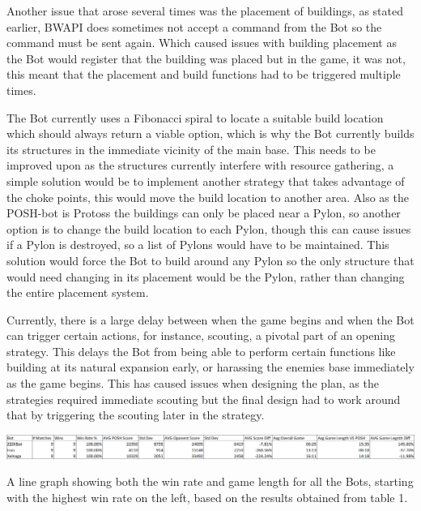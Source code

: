 \documentclass[journal]{IEEEtran}
\begin{document}
	Another issue that arose several times was the placement of buildings, as stated earlier, BWAPI does sometimes not accept a command from the Bot so the command must be sent again. Which caused issues with building placement as the Bot would register that the building was placed but in the game, it was not, this meant that the placement and build functions had to be triggered multiple times. 
	
	The Bot currently uses a Fibonacci spiral to locate a suitable build location which should always return a viable option, which is why the Bot currently builds its structures in the immediate vicinity of the main base. This needs to be improved upon as the structures currently interfere with resource gathering, a simple solution would be to implement another strategy that takes advantage of the choke points, this would move the build location to another area. Also as the POSH-bot is Protoss the buildings can only be placed near a Pylon, so another option is to change the build location to each Pylon, though this can cause issues if a Pylon is destroyed, so a list of Pylons would have to be maintained. This solution would force the Bot to build around any Pylon so the only structure that would need changing in its placement would be the Pylon, rather than changing the entire placement system.
	
	Currently, there is a large delay between when the game begins and when the Bot can trigger certain actions, for instance, scouting, a pivotal part of an opening strategy. This delays the Bot from being able to perform certain functions like building at its natural expansion early, or harassing the enemies base immediately as the game begins. This has caused issues when designing the plan, as the strategies required immediate scouting but the final design had to work around that by triggering the scouting later in the strategy.    
	\begin{table}
		\centering
		\includegraphics[width=\textwidth]{PvsBots}
		\caption{A line graph showing both the win rate and game length for all the Bots, starting with the highest win rate on the left, based on the results obtained from table 1.}
		\label{Table6}
	\end{table}
	
\end{document}
